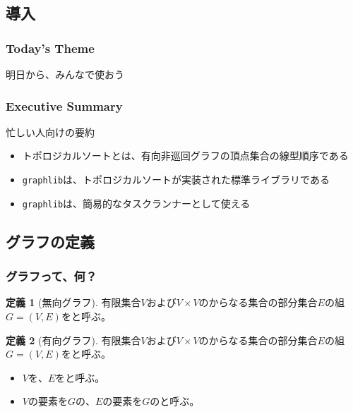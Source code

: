 \documentclass[aspectratio=169,dvipdfmx,12pt,notheorems]{beamer}
\theoremstyle{definition}
\newtheorem{definition}{定義}
\begin{document}
\subsection{導入}

\begin{frame}\frametitle{Today's Theme}

\begin{center}
\Huge{明日から、みんなで使おう}
\end{center}

\end{frame}

\begin{frame}\frametitle{Executive Summary}

\begin{block}{忙しい人向けの要約}
\begin{itemize}
\item トポロジカルソートとは、有向非巡回グラフの頂点集合の線型順序である
\item \texttt{graphlib}は、トポロジカルソートが実装された標準ライブラリである
\item \texttt{graphlib}は、簡易的なタスクランナーとして使える
\end{itemize}
\end{block}

\end{frame}

\subsection{グラフの定義}

\begin{frame}\frametitle{グラフって、何？}

\begin{definition}[無向グラフ]
有限集合$V$および$V\times V$のからなる集合の部分集合$E$の組$G=(V, E)$をと呼ぶ。
\end{definition}

\begin{definition}[有向グラフ]
有限集合$V$および$V\times V$のからなる集合の部分集合$E$の組$G=(V, E)$をと呼ぶ。
\end{definition}

\begin{itemize}
\item $V$を、$E$をと呼ぶ。
\item $V$の要素を$G$の、$E$の要素を$G$のと呼ぶ。
\end{itemize}

\end{frame}
\end{document}
